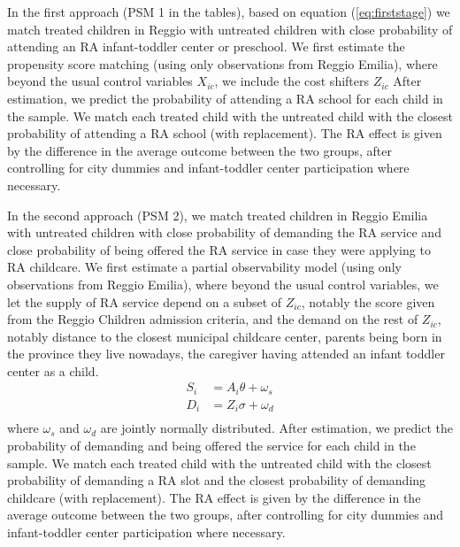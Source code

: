 \documentclass[12pt]{article}
\begin{document}
In the first approach (PSM 1 in the tables), based on equation (\ref{eq:firststage}) we match treated children in Reggio with untreated children with close probability of attending an RA infant-toddler center or preschool. We first estimate the propensity score matching (using only observations from Reggio Emilia), where beyond the usual control variables $X_{ic}$, we include the cost shifters $Z_{ic}$ %
After estimation, we predict the probability of attending a RA school for each child in the sample. We match each treated child with the untreated child with the closest probability of attending a RA school (with replacement). The RA effect is given by the difference in the average outcome between the two groups, after controlling for city dummies and infant-toddler center participation where necessary. 

In the second approach (PSM 2), we match treated children in Reggio Emilia with untreated children with close probability of demanding the RA service and close probability of being offered the RA service in case they were applying to RA childcare. We first estimate a partial observability model (using only observations from Reggio Emilia), where beyond the usual control variables, we let the supply of RA service depend on a subset of $Z_{ic}$, notably the score given from the Reggio Children admission criteria, and the demand on the rest of $Z_{ic}$, notably distance to the closest municipal childcare center, parents being born in the province they live nowadays, the caregiver having attended an infant toddler center as a child. 
\begin{align*}
S_i & = A_i \theta + \omega_s \\
D_i & = Z_i \sigma + \omega_d \\
\end{align*}
where $\omega_s$ and $\omega_d$ are jointly normally distributed. After estimation, we predict the probability of demanding and being offered the service for each child in the sample. We match each treated child with the untreated child with the closest probability of demanding a RA slot and the closest probability of demanding childcare (with replacement). The RA effect is given by the difference in the average outcome between the two groups, after controlling for city dummies and infant-toddler center participation where necessary. 
\end{document}
